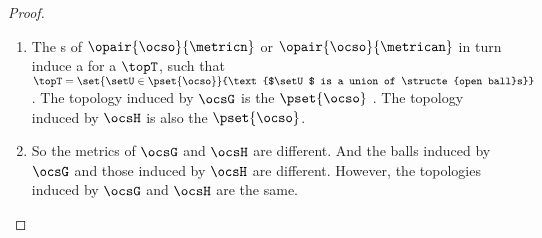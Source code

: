 \begin{tabstr}{0.75}
\begin{proof}
\begin{enumerate}
  \item The s of $\opair{\ocso}{\metricn}$ or $\opair{\ocso}{\metrican}$ 
        in turn induce a  for a  $\topT$, such that
        \\$\topT=\set{\setU\in\pset{\ocso}}{\text{$\setU$ is a union of \structe{open ball}s}}$.
        The topology induced by $\ocsG$ is the  $\pset{\ocso}$ .
        The topology induced by $\ocsH$ is also the  $\pset{\ocso}$.

  \item So the metrics of $\ocsG$ and $\ocsH$ are different.
        And the balls induced by $\ocsG$ and those induced by $\ocsH$ are different.
        However, the topologies induced by $\ocsG$ and $\ocsH$ are the same.
\end{enumerate}
\end{proof}



\end{tabstr}
